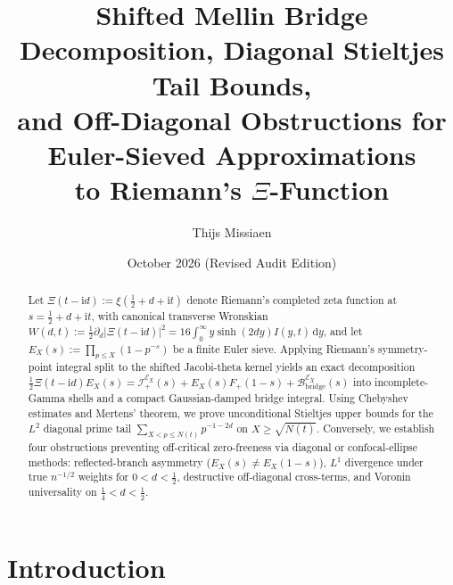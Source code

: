 \documentclass[11pt,reqno]{amsart}
\title[Shifted Mellin Bridge, Diagonal Tail Bounds, and Off-Diagonal Obstructions]{Shifted Mellin Bridge Decomposition, Diagonal Stieltjes Tail Bounds,\\ and Off-Diagonal Obstructions for Euler-Sieved Approximations\\ to Riemann's $\Xi$-Function}
\author{Thijs Missiaen}
\date{October 2026 (Revised Audit Edition)}
\theoremstyle{plain}
\theoremstyle{definition}
\theoremstyle{remark}
\numberwithin{equation}{section}
\newcommand{\dd}{\,\mathrm{d}}
\newcommand{\ii}{\mathrm{i}}
\begin{document}
\begin{abstract}
Let $\Xi(t - \ii d) := \xi(\frac{1}{2} + d + \ii t)$ denote Riemann's completed zeta function at $s = \frac{1}{2} + d + \ii t$, with canonical transverse Wronskian $W(d,t) := \frac{1}{2}\partial_d\lvert\Xi(t - \ii d)\rvert^2 = 16\int_0^\infty y\sinh(2dy)I(y,t)\dd y$, and let $E_X(s) := \prod_{p \le X}(1 - p^{-s})$ be a finite Euler sieve. Applying Riemann's symmetry-point integral split to the shifted Jacobi-theta kernel yields an exact decomposition $\frac{1}{2}\Xi(t - \ii d)E_X(s) = \mathcal{I}_+^{\mathcal{E}_X}(s) + E_X(s)F_+(1 - s) + \mathcal{B}_{\mathrm{bridge}}^{\mathcal{E}_X}(s)$ into incomplete-Gamma shells and a compact Gaussian-damped bridge integral. Using Chebyshev estimates and Mertens' theorem, we prove unconditional Stieltjes upper bounds for the $L^2$ diagonal prime tail $\sum_{X < p \le N(t)} p^{-1 - 2d}$ on $X \ge \sqrt{N(t)}$. Conversely, we establish four obstructions preventing off-critical zero-freeness via diagonal or confocal-ellipse methods: reflected-branch asymmetry ($E_X(s) \neq E_X(1-s)$), $L^1$ divergence under true $n^{-1/2}$ weights for $0 < d < \frac{1}{2}$, destructive off-diagonal cross-terms, and Voronin universality on $\frac{1}{4} < d < \frac{1}{2}$.
\end{abstract}

\maketitle

\section{Introduction}\label{sec:intro}
\end{document}
